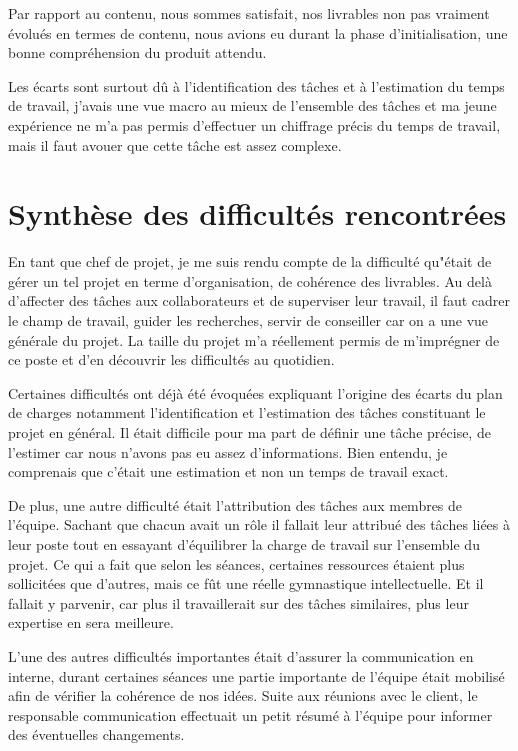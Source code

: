 Par rapport au contenu, nous sommes satisfait, nos livrables non pas vraiment évolués en termes de contenu, nous avions eu durant la phase d'initialisation, une bonne compréhension du produit attendu. 

Les écarts sont surtout dû à l'identification des tâches et à l'estimation du temps de travail, j'avais une vue macro au mieux de l'ensemble des tâches et ma jeune expérience ne m'a pas permis d'effectuer un chiffrage précis du temps de travail, mais il faut avouer que cette tâche est assez complexe.

\section{Synthèse des difficultés rencontrées}

          En tant que chef de projet, je me suis rendu compte de la difficulté qu"était de gérer un tel projet en terme d'organisation, de cohérence des livrables. Au delà d'affecter des tâches aux collaborateurs et de superviser leur  travail, il faut cadrer le champ de travail, guider les recherches, servir de conseiller car on a une vue générale du projet. La taille du projet m'a réellement permis de m'imprégner de ce poste et d'en découvrir les difficultés au quotidien. 

         Certaines difficultés ont déjà été évoquées expliquant l'origine des écarts du plan de charges notamment l'identification et l'estimation des tâches constituant le projet en général. Il était difficile pour ma part de définir une tâche précise, de l'estimer car nous n'avons pas eu assez d'informations. Bien
entendu, je comprenais que c'était une estimation et non un temps de travail exact. 

          De plus, une autre difficulté était l'attribution des tâches aux membres de l'équipe. Sachant que chacun avait un rôle il fallait leur attribué des tâches liées à leur poste tout en essayant d'équilibrer la charge de travail sur l'ensemble du projet. Ce qui a fait que selon les séances, certaines ressources étaient plus sollicitées que d'autres, mais ce fût une réelle gymnastique intellectuelle. Et il fallait y parvenir, car plus il travaillerait sur des tâches similaires, plus leur expertise en sera meilleure.

         L'une des autres difficultés importantes était d'assurer la communication en interne, durant certaines séances une partie importante de l'équipe était mobilisé afin de vérifier la cohérence de nos idées. Suite aux réunions avec le client, le responsable communication effectuait un petit résumé à l'équipe pour informer des éventuelles changements.

